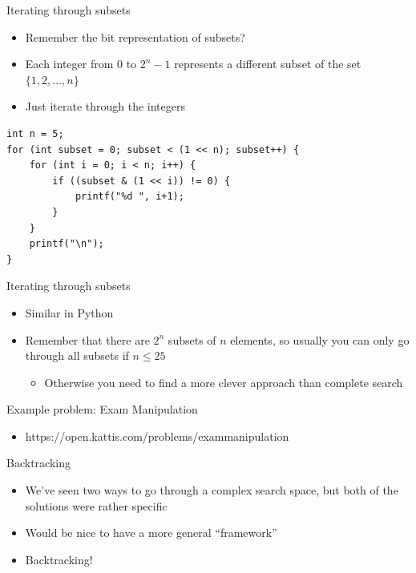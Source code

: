 \documentclass{beamer}
\begin{document}
\begin{frame}{Iterating through subsets}
    \begin{itemize}
        \item Remember the bit representation of subsets?
        \item Each integer from $0$ to $2^n - 1$ represents a different subset of the set $\{1,2,\ldots,n\}$
        \item Just iterate through the integers
    \end{itemize}

            \begin{verbatim}
int n = 5;
for (int subset = 0; subset < (1 << n); subset++) {
    for (int i = 0; i < n; i++) {
        if ((subset & (1 << i)) != 0) {
            printf("%d ", i+1);
        }
    }
    printf("\n");
}
            \end{verbatim}
\end{frame}

\begin{frame}[plain]{Iterating through subsets}
    \begin{itemize}
        \item Similar in Python
        \vspace{20pt}
        \item Remember that there are $2^n$ subsets of $n$ elements, so usually you can only go through all subsets if $n \leq 25$
            \begin{itemize}
                \item Otherwise you need to find a more clever approach than complete search
            \end{itemize}
            \vspace{20pt}
    \end{itemize}
\end{frame}

\begin{frame}[plain]{Example problem: Exam Manipulation}
    \begin{itemize}
        \item https://open.kattis.com/problems/exammanipulation
    \end{itemize}
\end{frame}

\begin{frame}{Backtracking}
    \begin{itemize}
        \item We've seen two ways to go through a complex search space, but both of the solutions were rather specific
        \item Would be nice to have a more general ``framework''
        \vspace{10pt}
        \item Backtracking!
    \end{itemize}
\end{frame}
\end{document}
